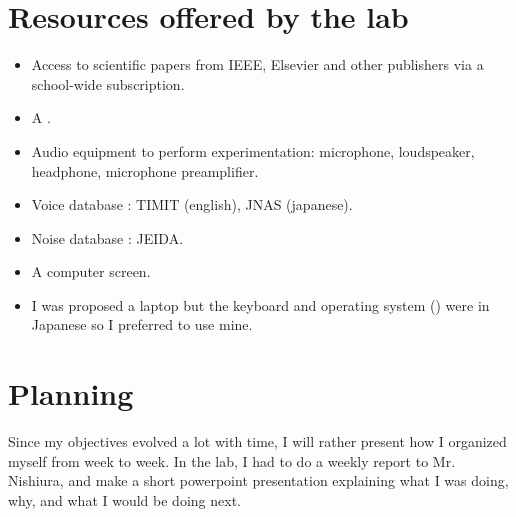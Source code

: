 \section{Resources offered by the lab}
\begin{itemize}
\item Access to scientific papers from \ac{IEEE}, Elsevier and other publishers via a school-wide subscription.
\item A .
\item Audio equipment to perform experimentation: microphone, loudspeaker, headphone, microphone preamplifier. 
\item Voice database : \ac{TIMIT} (english), \ac{JNAS} (japanese).
\item Noise database : \ac{JEIDA}.
\item A computer screen.
\item I was proposed a laptop but the keyboard and operating system () were in Japanese so I preferred to use mine.

\end{itemize}
\section{Planning}
Since my objectives evolved a lot with time, I will rather present how I organized myself from week to week.
In the lab, I had to do a weekly report to Mr. Nishiura, and make a short powerpoint presentation explaining what I was doing, why, and what I would be doing next.

